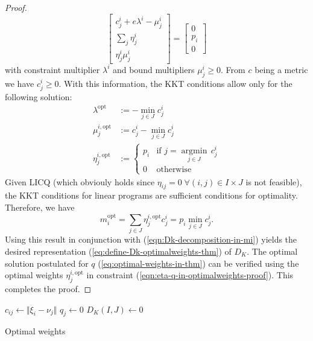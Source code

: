 \begin{proof}
\begin{equation}
  \label{eq:D-i-KKT-in-optimalweightsproof}
  \left[
  \begin{array}{c}
  c_j^i + e\lambda^i -\mu_j^i\\
  \sum_{j}\eta_j^i\\
  \eta_j^i\mu_j^i
  \end{array}
  \right]
  = \left[
    \begin{array}{c}
      0\\p_i\\0
    \end{array}
\right]
\end{equation}
with constraint multiplier $\lambda^i$ and bound multipliers $\mu_j^i\geq 0$.
From $c$ being a metric we have $c_j^i\geq 0$.
With this information, the KKT conditions allow only for the following solution:
\begin{align}
  \label{eq:optimal-eta-optmimalweightsproof}
  \lambda^{\mathrm{opt}} &:= -\min\limits_{j\in J}c_j^i\\
  \mu_j^{i,\mathrm{opt}} &:= c_j^i - \min\limits_{j\in J}c_j^i\\
  \eta_j^{i,\mathrm{opt}} &:= \left\{ \begin{array}{lr}p_i&\text{if }j=\underset{j\in J}{\operatorname{argmin}}\, c_j^i\\0&\text{otherwise}\end{array}\right.
\end{align}
Given LICQ (which obviouly holds since $\eta_{ij}=0\;\forall (i,j)\in I\times J$ is not feasible), the KKT conditions for linear programs are sufficient conditions for optimality.
Therefore, we have
\begin{equation}
  m_i^{\mathrm{opt}} = \sum_{j\in J}\eta_j^{i,\mathrm{opt}}c_j^i = p_i\min\limits_{j\in J}c_j^i.
\end{equation}
Using this result in conjunction with (\ref{eqn:Dk-decomposition-in-mi}) yields the desired representation (\ref{eq:define-Dk-optimalweights-thm}) of $D_K$.
The optimal solution postulated for $q$ (\ref{eq:optimal-weights-in-thm}) can be verified using the optimal weights $\eta_j^{i,\mathrm{opt}}$ in constraint (\ref{eqn:eta-q-in-optimalweights-proof}).
This completes the proof.
\end{proof}
\begin{algorithm}
  $c_{ij} \leftarrow \Vert \xi_i - \nu_j\Vert$
  $q_j \leftarrow 0$\;
  $D_K(I,J) \leftarrow 0$\;
  \caption{Optimal weights}
  \label{alg:optimal-weights}
\end{algorithm}
